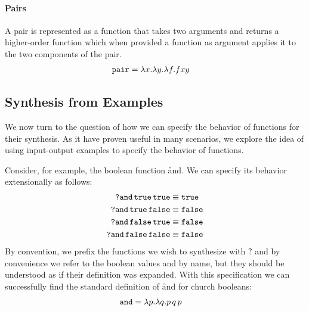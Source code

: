 \paragraph{Pairs}
%
A pair is represented as a function that takes two arguments
and returns a higher-order function which when provided a
function as argument applies it to the two components of the
pair.
%
\begin{align*}
  \texttt{pair} &= \lambda x. \lambda y. \lambda f.f x y
\end{align*}




\subsection{Synthesis from Examples}
%
We now turn to the question of how we can specify the
behavior of functions for their synthesis.
%
As it have proven useful in many scenarios, we explore the
idea of using input-output examples to specify the behavior
of functions.

Consider, for example, the boolean function \f{and}.
We can specify its behavior extensionally as follows:
%
\begin{align*}
\texttt{?and}\,\texttt{true}\,\texttt{true}    &\equiv \texttt{true} \\
\texttt{?and}\,\texttt{true}\,\texttt{false}   &\equiv \texttt{false} \\
\texttt{?and}\,\texttt{false}\,\texttt{true}   &\equiv \texttt{false} \\
\texttt{?and}\,\texttt{false}\, \texttt{false} &\equiv \texttt{false} \\
\end{align*}
%
By convention, we prefix the functions we wish to synthesize
with \f{?} and by convenience we refer to the boolean values
\true and \false by name, but they should be understood as
if their definition was expanded.
%
With this specification we can successfully find the
standard definition of \f{and} for church booleans:
\begin{align*}
  \texttt{and} &= \lambda p. \lambda q. p\,q\,p
\end{align*}

